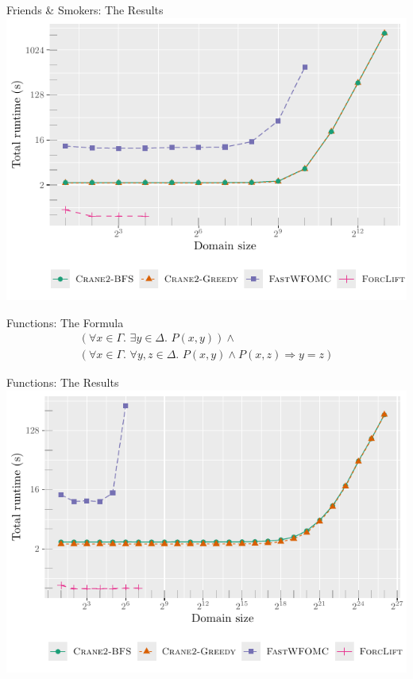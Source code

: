 \documentclass{beamer}
\begin{document}
\begin{frame}{Friends \& Smokers: The Results}
  \centering
  \includegraphics{friends.pdf}
\end{frame}

\begin{frame}{Functions: The Formula}
  \begin{gather*}
    (\forall x \in \Gamma\text{. }\exists y \in \Delta\text{. }P(x, y)) \land{}\\
    (\forall x \in \Gamma\text{. }\forall y, z \in \Delta\text{. }P(x, y) \land P(x, z) \Rightarrow y = z)
  \end{gather*}
\end{frame}

\begin{frame}{Functions: The Results}
  \centering
  \includegraphics{functions.pdf}
\end{frame}
\end{document}
